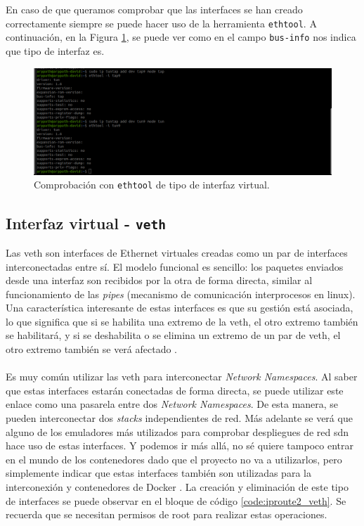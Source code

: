 En caso de que queramos comprobar que las interfaces se han creado correctamente siempre se puede hacer uso de la herramienta \texttt{ethtool}. A continuación, en la Figura \ref{fig:linux2}, se puede ver como en el campo \texttt{bus-info} nos indica que tipo de interfaz es.

\begin{figure}[ht]
    \centering
    \includegraphics[width=\textwidth]{archivos/img/teoria/linux2.png}
    \caption{Comprobación con \texttt{ethtool} de tipo de interfaz virtual.}
    \label{fig:linux2}
\end{figure}


\subsection{Interfaz virtual - \texttt{veth}}
\label{linuxVeths}
Las \gls{veth} son interfaces de Ethernet virtuales creadas como un par de interfaces interconectadas entre sí. El modelo funcional es sencillo: los paquetes enviados desde una interfaz son recibidos por la otra de forma directa, similar al funcionamiento de las \textit{pipes} (mecanismo de comunicación interprocesos en linux). Una característica interesante de estas interfaces es que su gestión está asociada, lo que significa que si se habilita una extremo de la \gls{veth}, el otro extremo también se habilitará, y si se deshabilita o se elimina un extremo de un par de \gls{veth}, el otro extremo también se verá afectado \cite{veth}.\\
\\
Es muy común utilizar las \gls{veth} para interconectar \textit{Network Namespaces}. Al saber que estas interfaces estarán conectadas de forma directa, se puede utilizar este enlace como una pasarela entre dos \textit{Network Namespaces}. De esta manera, se pueden interconectar dos \textit{stacks} independientes de red. Más adelante se verá que alguno de los emuladores más utilizados para comprobar despliegues de red \gls{sdn} hace uso de estas interfaces. Y podemos ir más allá, no sé quiere tampoco entrar en el mundo de los contenedores dado que el proyecto no va a utilizarlos, pero simplemente indicar que estas interfaces también son utilizadas para la interconexión y contenedores de Docker \cite{veths1}. La creación y eliminación de este tipo de interfaces se puede observar en el bloque de código \ref{code:iproute2_veth}. Se recuerda que se necesitan permisos de root para realizar estas operaciones.

